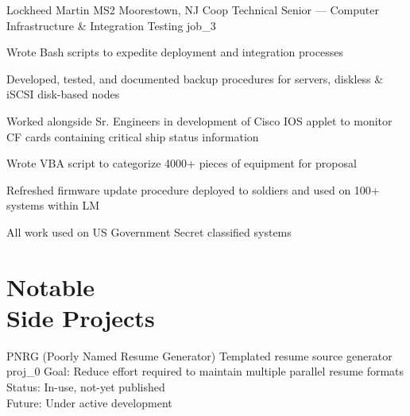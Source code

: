 \documentclass[10pt]{barag_resume}
\begin{document}
    \begin{job}{Lockheed Martin MS2}
        {Moorestown, NJ}
        {Coop Technical Senior --- Computer Infrastructure \& Integration Testing}
        {job_3}
            \item Wrote Bash scripts to expedite deployment and integration processes
            \item Developed, tested, and documented backup procedures for servers, diskless \& iSCSI disk-based nodes
            \item Worked alongside Sr. Engineers in development of Cisco IOS applet to monitor CF cards containing critical ship status information
            \item Wrote VBA script to categorize 4000+ pieces of equipment for proposal
            \item Refreshed firmware update procedure deployed to soldiers and used on 100+ systems within LM
            \item All work used on US Government Secret classified systems
    \end{job}


\section{Notable\\ Side Projects}\relax
    \begin{project}
        {PNRG (Poorly Named Resume Generator)}
        {Templated resume source generator}
        {proj_0}
            Goal: Reduce effort required to maintain multiple parallel resume formats\\
            Status: In-use, not-yet published\\
            Future: Under active development
    \end{project}
\end{document}
